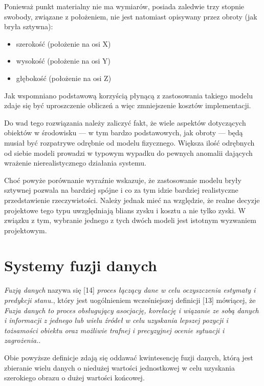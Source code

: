 \par{
Ponieważ punkt materialny nie ma wymiarów, posiada zaledwie trzy stopnie swobody, związane z położeniem, nie jest natomiast opisywany przez obroty (jak bryła sztywna):
\begin{itemize}
\item szerokość (położenie na osi X)
\item wysokość (położenie na osi Y)
\item głębokość (położenie na osi Z)
\end{itemize}
}

\par{
Jak wspomniano podstawową korzyścią płynącą z zastosowania takiego modelu zdaje się być uproszczenie obliczeń a więc zmniejszenie kosztów implementacji.
}
\par{
Do wad tego rozwiązania należy zaliczyć fakt, że wiele aspektów dotyczących obiektów w środowisku --- w tym bardzo podstawowych, jak obroty --- będą musiał być rozpatrywe odrębnie od modelu fizycznego. Większa ilość odrębnych od siebie modeli prowadzi w typowym wypadku do pewnych anomalii dających wrażenie nierealistycznego działania systemu.
}
\par{
Choć powyże porównanie wyraźnie wskazuje, że zastosowanie modelu bryły sztywnej pozwala na bardziej spójne i co za tym idzie bardziej realistyczne przedstawienie rzeczywistości. Należy jednak mieć na względzie, że realne decyzje projektowe tego typu uwzględniają blians zysku i kosztu a nie tylko zyski. W związku z tym, wybranie jednego z tych dwóch modeli jest istotnym wyzwaniem projektowym.
}

\section[Systemy fuzji danych][Systemy fuzji danych]{Systemy fuzji danych}
\par{
\textit{Fuzją danych} nazywa się [14] \textit{proces łączący dane w celu oczyszczenia estymaty i predykcji stanu.}, który jest uogólnieniem wcześniejszej definicji [13] mówiącej, że \textit{Fuzja danych to proces obsługujący asocjację, korelację i wiązanie ze sobą danych i informacji z jednego lub wielu źródeł w celu uzyskania lepszej pozycji i tożsamości obiektu oraz możliwie trafnej i precyzyjnej ocenie sytuacji i zagrożenia.}.
}
\par{
Obie powyższe definicje zdają się oddawać kwintesencję fuzji danych, którą jest zbieranie wielu danych o niedużej wartości jednostkowej w celu uzyskania szerokiego obrazu o dużej wartości końcowej.
}

